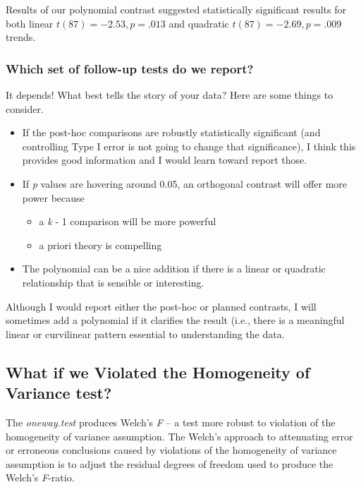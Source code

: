 \documentclass[
  english,
]{book}
\providecommand{\tightlist}{%
  \setlength{\itemsep}{0pt}\setlength{\parskip}{0pt}}
\begin{document}
Results of our polynomial contrast suggested statistically significant results for both linear \(t(87) = -2.53, p = .013\) and quadratic \(t(87) = -2.69, p = .009\) trends.

\hypertarget{which-set-of-follow-up-tests-do-we-report}{%
\subsubsection{Which set of follow-up tests do we report?}\label{which-set-of-follow-up-tests-do-we-report}}

It depends! What best tells the story of your data? Here are some things to consider.

\begin{itemize}
\tightlist
\item
  If the post-hoc comparisons are robustly statistically significant (and controlling Type I error is not going to change that significance), I think this provides good information and I would learn toward report those.
\item
  If \emph{p} values are hovering around 0.05, an orthogonal contrast will offer more power because

  \begin{itemize}
  \tightlist
  \item
    a \emph{k} - 1 comparison will be more powerful
  \item
    a priori theory is compelling
  \end{itemize}
\item
  The polynomial can be a nice addition if there is a linear or quadratic relationship that is sensible or interesting.
\end{itemize}

Although I would report either the post-hoc or planned contrasts, I will sometimes add a polynomial if it clarifies the result (i.e., there is a meaningful linear or curvilinear pattern essential to understanding the data.

\hypertarget{what-if-we-violated-the-homogeneity-of-variance-test}{%
\subsection{What if we Violated the Homogeneity of Variance test?}\label{what-if-we-violated-the-homogeneity-of-variance-test}}

The \emph{oneway.test} produces Welch's \emph{F} -- a test more robust to violation of the homogeneity of variance assumption. The Welch's approach to attenuating error or erroneous conclusions caused by violations of the homogeneity of variance assumption is to adjust the residual degrees of freedom used to produce the Welch's \emph{F}-ratio.
\end{document}
